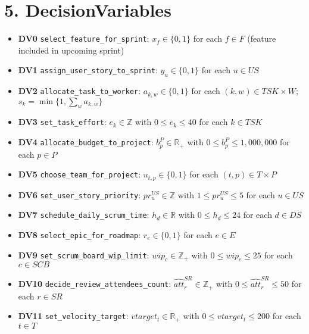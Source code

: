 \documentclass[11pt,a4paper]{article}
\begin{document}
\section{5. DecisionVariables}
\begin{itemize}[leftmargin=2em]
  \item \textbf{DV0} \texttt{select\_feature\_for\_sprint}:\; $x_f\in\{0,1\}$ for each $f\in F$ (feature included in upcoming sprint)
  \item \textbf{DV1} \texttt{assign\_user\_story\_to\_sprint}:\; $y_u\in\{0,1\}$ for each $u\in US$
  \item \textbf{DV2} \texttt{allocate\_task\_to\_worker}:\; $a_{k,w}\in\{0,1\}$ for each $(k,w)\in TSK\times W$;\; $s_k=\min\{1,\sum_w a_{k,w}\}$
  \item \textbf{DV3} \texttt{set\_task\_effort}:\; $e_k\in\mathbb{Z}$ with $0\le e_k\le 40$ for each $k\in TSK$
  \item \textbf{DV4} \texttt{allocate\_budget\_to\_project}:\; $b^{P}_p\in\mathbb{R}_{+}$ with $0\le b^{P}_p\le 1{,}000{,}000$ for each $p\in P$
  \item \textbf{DV5} \texttt{choose\_team\_for\_project}:\; $u_{t,p}\in\{0,1\}$ for each $(t,p)\in T\times P$
  \item \textbf{DV6} \texttt{set\_user\_story\_priority}:\; $pr^{US}_u\in\mathbb{Z}$ with $1\le pr^{US}_u\le 5$ for each $u\in US$
  \item \textbf{DV7} \texttt{schedule\_daily\_scrum\_time}:\; $h_d\in\mathbb{R}$ with $0\le h_d\le 24$ for each $d\in DS$
  \item \textbf{DV8} \texttt{select\_epic\_for\_roadmap}:\; $r_e\in\{0,1\}$ for each $e\in E$
  \item \textbf{DV9} \texttt{set\_scrum\_board\_wip\_limit}:\; $wip_c\in\mathbb{Z}_{+}$ with $0\le wip_c\le 25$ for each $c\in SCB$
  \item \textbf{DV10} \texttt{decide\_review\_attendees\_count}:\; $\widehat{att}^{SR}_r\in\mathbb{Z}_{+}$ with $0\le \widehat{att}^{SR}_r\le 50$ for each $r\in SR$
  \item \textbf{DV11} \texttt{set\_velocity\_target}:\; $vtarget_t\in\mathbb{R}_{+}$ with $0\le vtarget_t\le 200$ for each $t\in T$
\end{itemize}
\end{document}

